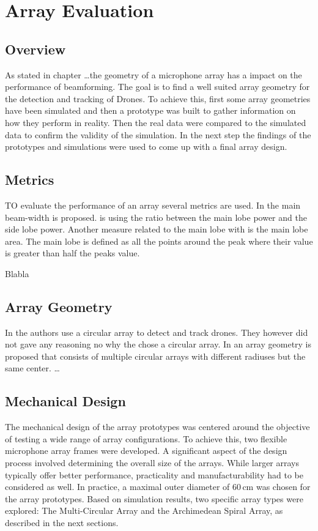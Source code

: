 \chapter{Array Evaluation}
\section{Overview}
As stated in chapter \dots the geometry of a microphone array
has a impact on the performance of beamforming.
The goal is to find a well suited array geometry for the detection and tracking of
Drones.
To achieve this, first some array geometries have been simulated and then
a prototype was built to gather information on how they perform in reality.
Then the real data were compared to the simulated data to
confirm the validity of the simulation.
In the next step the findings of the prototypes and simulations
were used to come up with a final array design.

\section{Metrics}
TO evaluate the performance of an array several metrics are used.
In  the
main beam-width is proposed.
 is using the ratio
between the main lobe power and the side lobe power.
Another measure related to the main lobe with is the main lobe area.
The main lobe is defined as all the points around the peak where their value
is greater than half the peaks value. 

Blabla
\section{Array Geometry}
In  the authors use a circular array to detect and track drones.
They however did not gave any reasoning no why the chose a circular array.
\cite{bandkProducts}
In \cite{arr1} an array geometry is proposed that consists of multiple circular
arrays with different radiuses but the same center.
\dots

\newpage
\section{Mechanical Design}
The mechanical design of the array prototypes was centered around the objective of testing a wide range of array configurations.
To achieve this, two flexible microphone array frames were developed.
A significant aspect of the design process involved determining the overall size of the arrays.
While larger arrays typically offer better performance, practicality and manufacturability had to be considered as well.
In practice, a maximal outer diameter of 60\,cm was chosen for the array prototypes.
Based on simulation results, two specific array types were explored: The Multi-Circular Array and the Archimedean Spiral Array, as described in the next sections.


